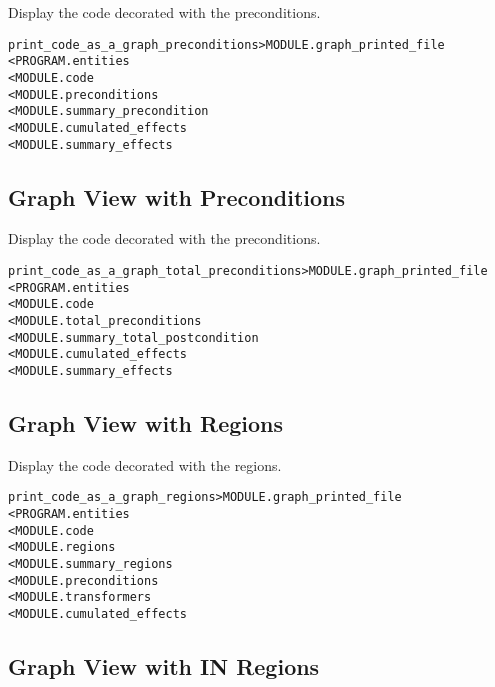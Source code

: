 \documentclass[a4paper]{report}
\newenvironment{PipsMake}{\begin{alltt}}{\end{alltt}}
\newenvironment{PipsPass}[1]{\label{pass:#1}}{}
\begin{document}
\begin{PipsPass}{print_code_as_a_graph_preconditions}
Display the code decorated with the preconditions.
\end{PipsPass}

\begin{PipsMake}
print_code_as_a_graph_preconditions        > MODULE.graph_printed_file
        < PROGRAM.entities
        < MODULE.code
        < MODULE.preconditions
        < MODULE.summary_precondition
        < MODULE.cumulated_effects
        < MODULE.summary_effects
\end{PipsMake}

\subsection{Graph View with Preconditions}

\begin{PipsPass}{print_code_as_a_graph_total_preconditions}
Display the code decorated with the preconditions.
\end{PipsPass}

\begin{PipsMake}
print_code_as_a_graph_total_preconditions        > MODULE.graph_printed_file
        < PROGRAM.entities
        < MODULE.code
        < MODULE.total_preconditions
        < MODULE.summary_total_postcondition
        < MODULE.cumulated_effects
        < MODULE.summary_effects
\end{PipsMake}

\subsection{Graph View with Regions}

\begin{PipsPass}{print_code_as_a_graph_regions}
Display the code decorated with the regions.
\end{PipsPass}

\begin{PipsMake}
print_code_as_a_graph_regions              > MODULE.graph_printed_file
        < PROGRAM.entities
        < MODULE.code
        < MODULE.regions
        < MODULE.summary_regions
        < MODULE.preconditions
        < MODULE.transformers
        < MODULE.cumulated_effects
\end{PipsMake}

\subsection{Graph View with IN Regions}
\end{document}
